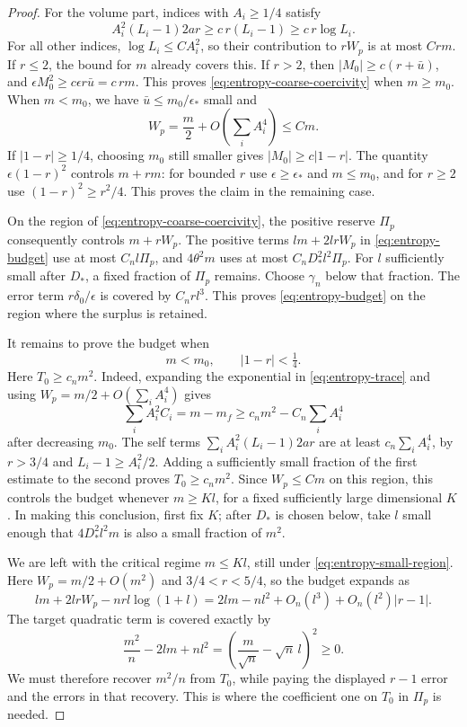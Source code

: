 \begin{proof}
For the volume part, indices with \(A_i\geq1/4\) satisfy
\[
 A_i^2(L_i-1)2ar\geq c\,r(L_i-1)\geq c\,r\log L_i.
\]
For all other indices, \(\log L_i\leq C A_i^2\), so their contribution
to \(rW_p\) is at most \(Crm\).  If \(r\leq2\), the bound for \(m\)
already covers this.  If \(r>2\), then
\(|M_0|\geq c(r+\bar u)\), and
\(\epsilon M_0^2\geq c\epsilon r\bar u=c\,rm\).
This proves \eqref{eq:entropy-coarse-coercivity} when \(m\geq m_0\).
When \(m<m_0\), we have \(\bar u\leq m_0/\epsilon_*\) small and
\[
 W_p=\frac m2+O\left(\sum_iA_i^4\right)\leq C m.
\]
If \(|1-r|\geq1/4\), choosing \(m_0\) still smaller gives
\(|M_0|\geq c|1-r|\).  The quantity
\(\epsilon(1-r)^2\) controls \(m+rm\): for bounded \(r\) use
\(\epsilon\geq\epsilon_*\) and \(m\leq m_0\), and for \(r\geq2\)
use \((1-r)^2\geq r^2/4\).  This proves the claim in the remaining
case.

On the region of \eqref{eq:entropy-coarse-coercivity}, the positive
reserve \(\Pi_p\) consequently controls \(m+rW_p\).  The positive terms
\(lm+2lrW_p\) in \eqref{eq:entropy-budget} use at most \(C_nl\Pi_p\),
and \(4\theta^2m\) uses at most \(C_nD_*^2l^2\Pi_p\).  For \(l\)
sufficiently small after \(D_*\), a fixed fraction of \(\Pi_p\)
remains.  Choose \(\gamma_n\) below that fraction.  The error term
\(r\delta_0/\epsilon\) is covered by \(C_nr l^3\).  This proves
\eqref{eq:entropy-budget} on the region where the surplus is retained.

It remains to prove the budget when
\begin{equation}\label{eq:entropy-small-region}
 m<m_0,\qquad |1-r|<\tfrac14.
\end{equation}
Here \(T_0\geq c_nm^2\).  Indeed, expanding the exponential in
\eqref{eq:entropy-trace} and using
\(W_p=m/2+O(\sum_iA_i^4)\) gives
\[
 \sum_i A_i^2 C_i=m-m_f
       \geq c_n m^2-C_n\sum_iA_i^4
\]
after decreasing \(m_0\).  The self terms
\(\sum_i A_i^2(L_i-1)2ar\) are at least
\(c_n\sum_iA_i^4\), by \(r>3/4\) and \(L_i-1\geq A_i^2/2\).
Adding a sufficiently small fraction of the first estimate to the
second proves \(T_0\geq c_nm^2\).
Since \(W_p\leq Cm\) on this region, this controls the budget whenever
\(m\geq Kl\), for a fixed sufficiently large dimensional \(K\).
In making this conclusion, first fix \(K\); after \(D_*\) is chosen
below, take \(l\) small enough that \(4D_*^2l^2m\) is also a small
fraction of \(m^2\).

We are left with the critical regime \(m\leq Kl\), still under
\eqref{eq:entropy-small-region}.  Here
\(W_p=m/2+O(m^2)\) and \(3/4<r<5/4\), so the budget expands as
\[
 lm+2lrW_p-nrl\log(1+l)
 =2lm-nl^2+O_n(l^3)+O_n(l^2)|r-1|.
\]
The target quadratic term is covered exactly by
\[
 \frac{m^2}{n}-2lm+nl^2
       =\left(\frac m{\sqrt n}-\sqrt n\,l\right)^2\geq0.
\]
We must therefore recover \(m^2/n\) from \(T_0\), while paying the
displayed \(r-1\) error and the errors in that recovery.  This is where
the coefficient one on \(T_0\) in \(\Pi_p\) is needed.


\end{proof}
